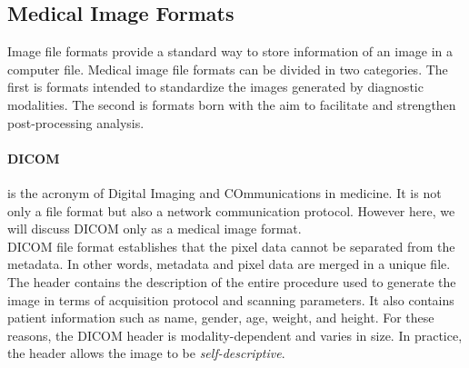 \documentclass{standalone}
\begin{document}
    
\subsection{Medical Image Formats}

Image file formats provide a standard way to store information of an image in a computer file\cite{biondi}.
Medical image file formats can be divided in two categories. The first is formats intended to standardize the images generated by diagnostic modalities. 
The second is formats born with the aim to facilitate and strengthen post-processing analysis\cite{Larobina}.

\paragraph{DICOM} is the acronym of Digital Imaging and COmmunications in medicine.
It is not only a file format but also a network communication protocol\cite{Larobina}.
However here, we will discuss DICOM only as a medical image format.\\
DICOM file format establishes that the pixel data cannot be separated from the metadata\cite{Larobina}.
In other words, metadata and pixel data are merged in a unique file.
The header contains the description of the entire procedure used to generate the image in terms of acquisition protocol and scanning parameters\cite{Larobina}. 
It also contains patient information such as name, gender, age, weight, and height. 
For these reasons, the DICOM header is modality-dependent and varies in size. 
In practice, the header allows the image to be \textit{self-descriptive}.
\end{document}
